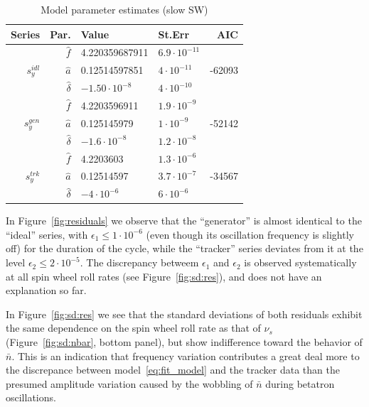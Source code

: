 \begin{table}[h]\centering
	\caption{Model parameter estimates (slow SW)\label{tbl:param_estimates}}
	\begin{tabular}{r|rllr}
		\hline
		Series & Par. & Value & St.Err & AIC \\
		\hline
		\multirow{3}{*}{$s_y^{idl}$}
		& $\hat f$ & 4.220359687911 & $6.9\cdot10^{-11}$ & \multirow{3}{*}{-62093} \\
		& $\hat a$ & 0.12514597851 & $4\cdot10^{-11}$ & \\
		& $\hat\delta$ & $-1.50\cdot10^{-8}$ & $4\cdot 10^{-10}$ &\\
		\hline
		\multirow{3}{*}{$s_y^{gen}$}
		& $\hat f$ & 4.2203596911 & $1.9\cdot 10^{-9}$ & \multirow{3}{*}{-52142} \\
		& $\hat a$ & 0.125145979 & $1\cdot 10^{-9}$ & \\
		& $\hat\delta$ & $-1.6\cdot 10^{-8}$ & $1.2\cdot 10^{-8}$ &\\
		\hline
		\multirow{3}{*}{$s_y^{trk}$}
		& $\hat f$ & 4.2203603 & $1.3\cdot 10^{-6}$ & \multirow{3}{*}{-34567} \\
		& $\hat a$ & 0.12514597 & $3.7\cdot10^{-7}$ & \\
		& $\hat\delta$ & $-4\cdot10^{-6}$ & $6\cdot 10^{-6}$ &\\
		\hline
	\end{tabular}
\end{table}


In Figure~\ref{fig:residuals} we observe that the ``generator'' is almost identical to the 
``ideal'' series, with $\epsilon_1 \le 1\cdot10^{-6}$ (even though its oscillation frequency is slightly off)
for the duration of the cycle, while the ``tracker'' series deviates from it at the level
$\epsilon_2 \le 2\cdot 10^{-5}$.  The discrepancy betweem $\epsilon_1$ and $\epsilon_2$ is observed
systematically at all spin wheel roll rates (see Figure~\ref{fig:sd:res}), and does not have an explanation
so far.

In Figure~\ref{fig:sd:res} we see that the standard deviations of both residuals exhibit the same dependence
on the spin wheel roll rate as that of $\nu_s$ (Figure~\ref{fig:sd:nbar}, bottom panel), but show indifference
toward the behavior of $\bar n$. This is an indication that frequency variation contributes a great deal more to the discrepance between model~\eqref{eq:fit_model} and the tracker data than the presumed amplitude variation
caused by the wobbling of $\bar n$ during betatron oscillations.

